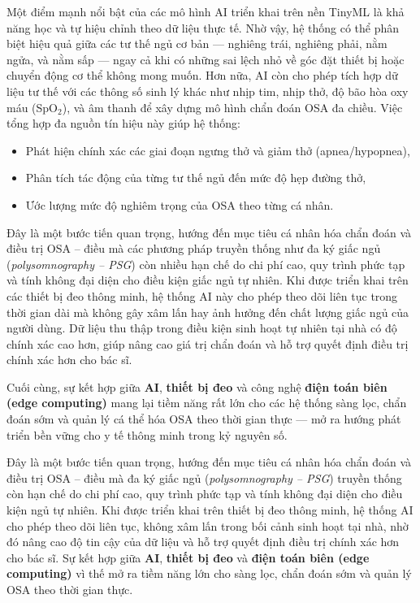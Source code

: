 Một điểm mạnh nổi bật của các mô hình AI triển khai trên nền TinyML là khả năng học và tự hiệu chỉnh theo dữ liệu thực tế. Nhờ vậy, hệ thống có thể phân biệt hiệu quả giữa các tư thế ngủ cơ bản — nghiêng trái, nghiêng phải, nằm ngửa, và nằm sấp — ngay cả khi có những sai lệch nhỏ về góc đặt thiết bị hoặc chuyển động cơ thể không mong muốn. 
Hơn nữa, AI còn cho phép tích hợp dữ liệu tư thế với các thông số sinh lý khác như nhịp tim, nhịp thở, độ bão hòa oxy máu (SpO$_2$), và âm thanh để xây dựng mô hình chẩn đoán OSA đa chiều. Việc tổng hợp đa nguồn tín hiệu này giúp hệ thống: 
\begin{itemize}
    \item Phát hiện chính xác các giai đoạn ngưng thở và giảm thở (apnea/hypopnea),
    \item Phân tích tác động của từng tư thế ngủ đến mức độ hẹp đường thở,
    \item Ước lượng mức độ nghiêm trọng của OSA theo từng cá nhân.
\end{itemize}
Đây là một bước tiến quan trọng, hướng đến mục tiêu cá nhân hóa chẩn đoán và điều trị OSA – điều mà các phương pháp truyền thống như đa ký giấc ngủ (\textit{polysomnography – PSG}) còn nhiều hạn chế do chi phí cao, quy trình phức tạp và tính không đại diện cho điều kiện giấc ngủ tự nhiên.
Khi được triển khai trên các thiết bị đeo thông minh, hệ thống AI này cho phép theo dõi liên tục trong thời gian dài mà không gây xâm lấn hay ảnh hưởng đến chất lượng giấc ngủ của người dùng. Dữ liệu thu thập trong điều kiện sinh hoạt tự nhiên tại nhà có độ chính xác cao hơn, giúp nâng cao giá trị chẩn đoán và hỗ trợ quyết định điều trị chính xác hơn cho bác sĩ.

Cuối cùng, sự kết hợp giữa \textbf{AI}, \textbf{thiết bị đeo} và công nghệ \textbf{điện toán biên (edge computing)} mang lại tiềm năng rất lớn cho các hệ thống sàng lọc, chẩn đoán sớm và quản lý cá thể hóa OSA theo thời gian thực — mở ra hướng phát triển bền vững cho y tế thông minh trong kỷ nguyên số.

Đây là một bước tiến quan trọng, hướng đến mục tiêu cá nhân hóa chẩn đoán và điều trị OSA – điều mà đa ký giấc ngủ (\textit{polysomnography – PSG}) truyền thống còn hạn chế do chi phí cao, quy trình phức tạp và tính không đại diện cho điều kiện ngủ tự nhiên. Khi được triển khai trên thiết bị đeo thông minh, hệ thống AI cho phép theo dõi liên tục, không xâm lấn trong bối cảnh sinh hoạt tại nhà, nhờ đó nâng cao độ tin cậy của dữ liệu và hỗ trợ quyết định điều trị chính xác hơn cho bác sĩ. Sự kết hợp giữa \textbf{AI}, \textbf{thiết bị đeo} và \textbf{điện toán biên (edge computing)} vì thế mở ra tiềm năng lớn cho sàng lọc, chẩn đoán sớm và quản lý OSA theo thời gian thực.

